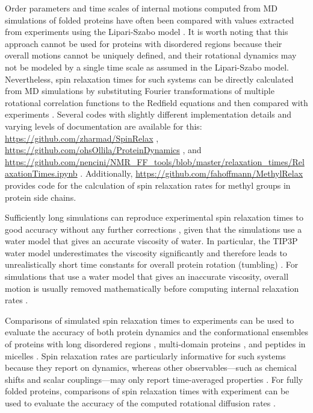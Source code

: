 \documentclass[9pt,review,pubversion]{livecoms}
\begin{document}
Order parameters and time scales of internal motions computed from MD simulations of folded proteins have often been compared with values extracted from experiments using the Lipari-Szabo model \cite{lipari_protein_1982,best_determination_2004,showalter_toward_2007,showalter_validation_2007,maragakis_microsecond_2008,trbovic_structural_2008,fenwick_classic_2016}.
It is worth noting that this approach cannot be used for proteins with disordered regions because their overall motions cannot be uniquely defined, and their rotational dynamics may not be modeled by a single time scale as assumed in the Lipari-Szabo model.
Nevertheless, spin relaxation times for such systems can be directly calculated from MD simulations by substituting Fourier transformations of multiple rotational correlation functions to the Redfield equations and then compared with experiments \cite{chen_ab_2018,ollila_rotational_2018,hoffmann_predicting_2020,virtanen_heterogeneous_2020}.
Several codes with slightly different implementation details and varying levels of documentation are available for this: \url{https://github.com/zharmad/SpinRelax} \cite{chen_ab_2018}, \url{https://github.com/ohsOllila/ProteinDynamics} \cite{ollila_rotational_2018}, and \url{https://github.com/nencini/NMR_FF_tools/blob/master/relaxation_times/RelaxationTimes.ipynb} \cite{nencini_probing_2024}.
Additionally, \url{https://github.com/fahoffmann/MethylRelax} \cite{hoffmann_predicting_2020} provides code for the calculation of spin relaxation rates for methyl groups in protein side chains.

Sufficiently long simulations \cite{bowman_accurately_2016} can reproduce experimental spin relaxation times to good accuracy without any further corrections \cite{virtanen_heterogeneous_2020}, given that the simulations use a water model that gives an accurate viscosity of water.
In particular, the TIP3P water model \cite{jorgensen_comparison_1983} underestimates the viscosity significantly and therefore leads to unrealistically short time constants for overall protein rotation (tumbling) \cite{wong_evaluating_2008}.
For simulations that use a water model that gives an inaccurate viscosity, overall motion is usually removed mathematically before computing internal relaxation rates \cite{prompers_general_2002,wong_evaluating_2008,anderson_rotational_2012,chen_ab_2018,hoffmann_accurate_2018,ollila_rotational_2018}.

Comparisons of simulated spin relaxation times to experiments can be used to evaluate the accuracy of both protein dynamics and the conformational ensembles of proteins with long disordered regions \cite{lindorff2012structure,virtanen_heterogeneous_2020}, multi-domain proteins \cite{sandelin_qebss_2024}, and peptides in micelles \cite{nencini_probing_2024}.
Spin relaxation rates are particularly informative for such systems because they report on dynamics, whereas other observables---such as chemical shifts and scalar couplings---may only report time-averaged properties \cite{virtanen_heterogeneous_2020}.
For fully folded proteins, comparisons of spin relaxation times with experiment can be used to evaluate the accuracy of the computed rotational diffusion rates \cite{ollila_rotational_2018}.
\end{document}
